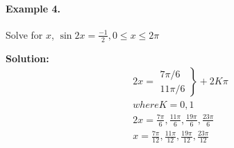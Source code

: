 \documentclass{article}
\begin{document}
\paragraph{Example 4.}
Solve for $x$, $\sin 2x = \frac{-1}{2}, 0 \leq x \leq 2\pi$

{\scriptsize \textbf{Solution:}}
\[
  \begin{aligned}
    2x =  \left. \begin{array}{c} 7\pi/6 \\ 11\pi/6 \end{array} \right\} + 2K\pi \\
    where K = 0, 1 \\
    2x = \frac{7\pi}{6}, \frac{11\pi}{6}, \frac{19\pi}{6}, \frac{23\pi}{6} \\
    x = \frac{7\pi}{12}, \frac{11\pi}{12}, \frac{19\pi}{12}, \frac{23\pi}{12}
  \end{aligned}
\]
\end{document}
